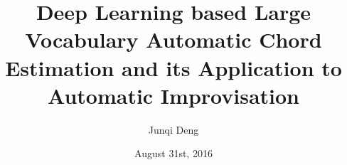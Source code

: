 
\clearpage{}  %

\title{\LARGE Deep Learning based Large Vocabulary Automatic Chord Estimation and its Application to Automatic Improvisation}

\author{Junqi Deng}

\date{August 31st, 2016}


\thesis







\begin{umiabstract}
  
\end{umiabstract}

